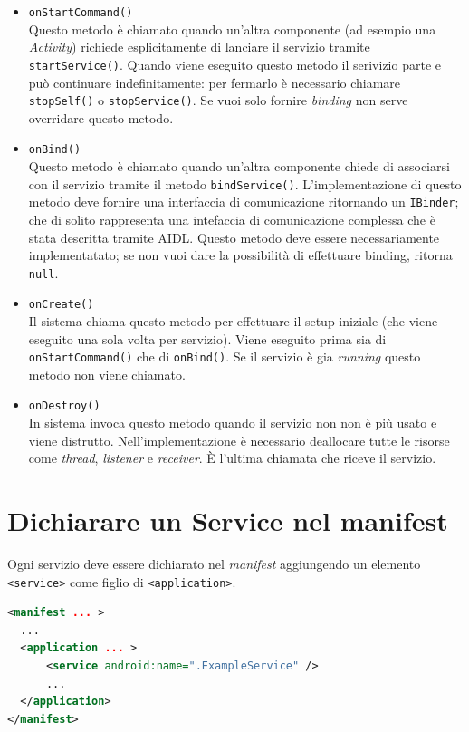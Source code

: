 \documentclass{book}
\begin{document}
\begin{itemize}
	\item \texttt{onStartCommand()}\\
	Questo metodo è chiamato quando un'altra componente (ad esempio una \textit{Activity}) richiede esplicitamente di lanciare il servizio tramite \texttt{startService()}. Quando viene eseguito questo metodo il serivizio parte e può continuare indefinitamente: per fermarlo è necessario chiamare \texttt{stopSelf()} o \texttt{stopService()}. Se vuoi solo fornire \textit{binding} non serve overridare questo metodo.
	\item \texttt{onBind()}\\
	Questo metodo è chiamato quando un'altra componente chiede di associarsi con il servizio tramite il metodo \texttt{bindService()}. L'implementazione di questo metodo deve fornire una interfaccia di comunicazione ritornando un \texttt{IBinder}; che di solito rappresenta una intefaccia di comunicazione complessa che è stata descritta tramite AIDL. Questo metodo deve essere necessariamente implementatato; se non vuoi dare la possibilità di effettuare binding, ritorna \texttt{null}.
	\item \texttt{onCreate()}\\
	Il sistema chiama questo metodo per effettuare il setup iniziale (che viene eseguito una sola volta per servizio). Viene eseguito prima sia di \texttt{onStartCommand()} che di \texttt{onBind()}. Se il servizio è gia \textit{running} questo metodo non viene chiamato.
	\item \texttt{onDestroy()}\\
	In sistema invoca questo metodo quando il servizio non non è più usato e viene distrutto. Nell'implementazione è necessario deallocare tutte le risorse come \textit{thread}, \textit{listener} e \textit{receiver}. È l'ultima chiamata che riceve il servizio.
\end{itemize}

\section{Dichiarare un Service nel manifest}
Ogni servizio deve essere dichiarato nel \textit{manifest} aggiungendo un elemento \texttt{<service>} come figlio di \texttt{<application>}.
\begin{lstlisting}[language=XML]
<manifest ... >
  ...
  <application ... >
      <service android:name=".ExampleService" />
      ...
  </application>
</manifest>
\end{lstlisting}
\end{document}
